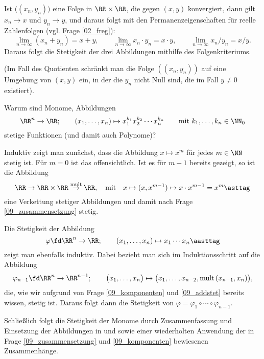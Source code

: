 \begin{antwort}
  Ist $\big( (x_n,y_n) \big)$ eine Folge in $\RR\times\RR$, die 
  gegen $(x,y)$ konvergiert, dann gilt $x_n \to x $ und $y_n \to y$, und 
  daraus folgt mit den Permanenzeigenschaften für reelle Zahlenfolgen 
  (vgl. Frage \ref{02_freg}):
  \[
  \lim_{n\to\infty} (x_n + y_n)=x+y, \qquad
  \lim_{n\to\infty} x_n \cdot y_n = x\cdot y, \qquad
  \lim_{n\to\infty} x_n / y_n = x/y.
  \]
  Daraus folgt die Stetigkeit der drei Abbildungen 
  mithilfe des Folgenkriteriums. 

  (Im Fall des Quotienten schränkt man die Folge $\left( (x_n,y_n) \right)$ 
  auf eine Umgebung von $(x,y)$ ein, in der die $y_n$ nicht Null sind, 
  die im Fall $y\not=0$ existiert). \AntEnd
\end{antwort}

\begin{frage}
  Warum sind Monome, {\dasheisst} Abbildungen 
  \[
  \RR^n \to \RR; \qquad (x_1, \ldots, x_n ) 
  \mapsto x_1^{k_1}x_2^{k_2}  \cdots x_n^{k_n} 
  \qquad\text{mit $k_1,\ldots,k_n \in \NN_0$}
  \]
  stetige Funktionen (und damit auch Polynome)?  
\end{frage}

\begin{antwort}
  Induktiv zeigt man zunächst, dass die Abbildung 
  $x\mapsto x^m$ für jedes $m\in \NN$ stetig ist. 
  Für $m=0$ ist das offensichtlich. 
  Ist es für $m-1$ bereits gezeigt, so ist die Abbildung 
  \begin{equation}
    \RR \to \RR\times \RR \stackrel{\mathrm{mult}}{\to} \RR, 
    \quad\text{mit}\quad
    x \mapsto (x,x^{m-1}) \mapsto x\cdot x^{m-1} = x^m 
    \asttag
  \end{equation}
  eine Verkettung stetiger Abbildungen und damit nach Frage 
  \ref{09_zusammensetzung} stetig. 

  Die Stetigkeit der Abbildung 
  \begin{equation}
    \varphi\fd \RR^n\to \RR; \qquad (x_1,\ldots,x_n) \mapsto x_1\cdots x_n
    \aasttag
  \end{equation}
  zeigt man ebenfalls induktiv. Dabei 
  bezieht man sich im Induktionsschritt auf die Abbildung  
  \[
  \varphi_{n-1} \fd \RR^n \to \RR^{n-1}; \qquad \big(x_1,\ldots,x_n\big) \mapsto 
  \big( x_1,\ldots, x_{n-2}, \mathrm{mult}\,(x_{n-1},x_n) \big),
  \]
  die, wie wir aufgrund von Frage 
  \ref{09_komponenten} und \ref{09_addstet} bereits wissen, stetig 
  ist. Daraus folgt dann die Stetigkeit von $\varphi=\varphi_1 
  \circ \cdots \circ \varphi_{n-1}$.  

  Schließlich folgt die Stetigkeit der Monome durch Zusammenfassung 
  und Einsetzung der Abbildungen in {\astref} und {\astastref} sowie 
  einer wiederholten 
  Anwendung der in Frage 
  \ref{09_zusammensetzung} und \ref{09_komponenten} bewiesenen Zusammenhänge.
  \AntEnd
\end{antwort}

